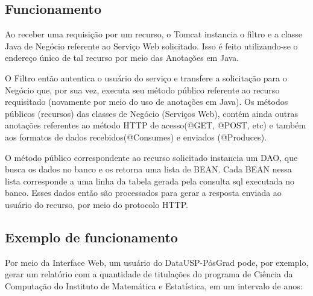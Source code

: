 \subsection{Funcionamento}
\label{sub:func}
Ao receber uma requisição por um recurso, o Tomcat instancia o filtro e a classe Java de Negócio referente ao Serviço Web solicitado. Isso é feito utilizando-se o endereço único de tal recurso por meio das Anotações em Java.  
\par
O Filtro então autentica o usuário do serviço e transfere a solicitação para o Negócio que, por sua vez, executa seu método público referente ao recurso requisitado (novamente por meio do uso de anotações em Java). Os métodos públicos (recursos) das classes de Negócio (Serviços Web), contém ainda outras anotações referentes ao método HTTP de acesso(@GET, @POST, etc) e também aos formatos de dados recebidos(@Consumes) e enviados (@Produces). 
\par
O método público correspondente ao recurso solicitado instancia um DAO, que busca os dados no banco e os retorna uma lista de BEAN. Cada BEAN nessa lista corresponde a uma linha da tabela gerada pela consulta sql executada no banco.  Esses dados então são processados para gerar a resposta enviada ao usuário do recurso, por meio do protocolo HTTP.

\subsection{Exemplo de funcionamento}
\label{sub:exemplo}

Por meio da Interface Web, um usuário do DataUSP-PósGrad pode, por exemplo, gerar um relatório
com a quantidade de titulações do programa de Ciência da Computação do Instituto
de Matemática e Estatística, em um intervalo de anos:


